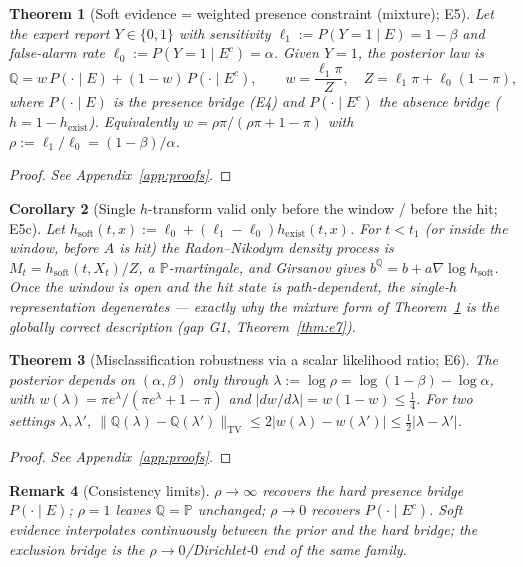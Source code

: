 \documentclass[11pt]{article}
\newtheorem{theorem}{Theorem}
\newtheorem{corollary}[theorem]{Corollary}
\newtheorem{remark}[theorem]{Remark}
\begin{document}
\begin{theorem}[Soft evidence = weighted presence constraint (mixture); E5]\label{thm:e5}
Let the expert report $Y\in\{0,1\}$ with sensitivity $\ell_1:=P(Y{=}1\mid E)=1-\beta$ and
false-alarm rate $\ell_0:=P(Y{=}1\mid E^{c})=\alpha$. Given $Y=1$, the posterior law is
\begin{equation}
  \mathbb{Q}=w\,P(\cdot\mid E)+(1-w)\,P(\cdot\mid E^{c}),\qquad
  w=\frac{\ell_1\pi}{Z},\quad Z=\ell_1\pi+\ell_0(1-\pi),
\end{equation}
where $P(\cdot\mid E)$ is the presence bridge (E4) and $P(\cdot\mid E^{c})$ the absence
bridge ($h=1-h_{\mathrm{exist}}$). Equivalently $w=\rho\pi/(\rho\pi+1-\pi)$ with
$\rho:=\ell_1/\ell_0=(1-\beta)/\alpha$.
\end{theorem}
\begin{proof}\emph{See Appendix~\ref{app:proofs}.}\end{proof}

\begin{corollary}[Single $h$-transform valid only before the window / before the hit; E5c]\label{thm:e5c}
Let $h_{\mathrm{soft}}(t,x):=\ell_0+(\ell_1-\ell_0)h_{\mathrm{exist}}(t,x)$. For $t<t_1$ (or
inside the window, before $A$ is hit) the Radon--Nikodym density process is
$M_t=h_{\mathrm{soft}}(t,X_t)/Z$, a $\mathbb{P}$-martingale, and Girsanov gives
$b^{\mathbb{Q}}=b+a\nabla\log h_{\mathrm{soft}}$. Once the window is open and the hit state is
path-dependent, the single-$h$ representation degenerates --- exactly why the mixture form
of Theorem~\ref{thm:e5} is the globally correct description (gap G1, Theorem~\ref{thm:e7}).
\end{corollary}

\begin{theorem}[Misclassification robustness via a scalar likelihood ratio; E6]\label{thm:e6}
The posterior depends on $(\alpha,\beta)$ only through
$\lambda:=\log\rho=\log(1-\beta)-\log\alpha$, with
$w(\lambda)=\pi e^{\lambda}/(\pi e^{\lambda}+1-\pi)$ and
$|dw/d\lambda|=w(1-w)\le\tfrac14$. For two settings $\lambda,\lambda'$,
$\|\mathbb{Q}(\lambda)-\mathbb{Q}(\lambda')\|_{\mathrm{TV}}
\le 2|w(\lambda)-w(\lambda')|\le\tfrac12|\lambda-\lambda'|$.
\end{theorem}
\begin{proof}\emph{See Appendix~\ref{app:proofs}.}\end{proof}

\begin{remark}[Consistency limits]
$\rho\to\infty$ recovers the hard presence bridge $P(\cdot\mid E)$; $\rho=1$ leaves
$\mathbb{Q}=\mathbb{P}$ unchanged; $\rho\to0$ recovers $P(\cdot\mid E^{c})$. Soft evidence
interpolates continuously between the prior and the hard bridge; the exclusion bridge is
the $\rho\to0$/Dirichlet-$0$ end of the same family.
\end{remark}
\end{document}
